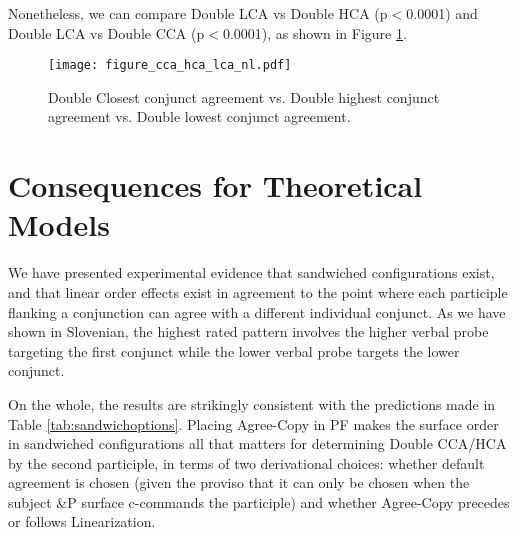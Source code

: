 \documentclass[output=paper
,modfonts
,nonflat]{langsci/langscibook}
\begin{document}
Nonetheless, we can compare Double LCA vs Double HCA (p$<$0.0001) and Double LCA vs Double CCA (p$<$0.0001), as shown in Figure \ref{fig:figure_cca_hca_lca}. 


\begin{figure}[!h]
\begin{center}
\texttt{[image: figure\_cca\_hca\_lca\_nl.pdf]}
\end{center}
\caption{Double Closest conjunct agreement vs. Double highest conjunct agreement vs. Double lowest conjunct agreement.}
\label{fig:figure_cca_hca_lca}
\end{figure}


\section{Consequences for Theoretical Models}
We have presented experimental evidence that sandwiched configurations exist, and that linear order effects exist in agreement to the point where each participle flanking a conjunction can agree with a different individual conjunct. As we have shown in Slovenian, the highest rated pattern involves the higher verbal probe targeting the first conjunct while the lower verbal probe targets the lower conjunct. 

On the whole, the results are strikingly consistent with the predictions made in Table \ref{tab:sandwichoptions}. Placing Agree-Copy in PF makes the surface order in sandwiched configurations all that matters for determining Double CCA/HCA by the second participle, in terms of two derivational choices: whether default agreement is chosen (given the proviso that it can only be chosen when the subject \&P surface c-commands the participle) and whether Agree-Copy precedes or follows Linearization.
\end{document}
